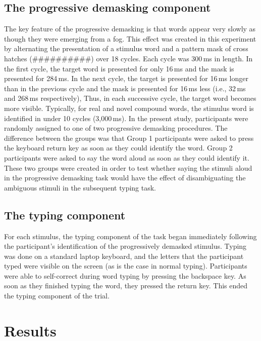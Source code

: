 \documentclass[output=paper]{langsci/langscibook}
\begin{document}
\subsection{The progressive demasking component}\label{sec:libben:2.3.1}
The key feature of the progressive demasking is that words appear very slowly as though they were emerging from a fog. This effect was created in this experiment by alternating the presentation of a stimulus word and a pattern mask of cross hatches (\#\#\#\#\#\#\#\#\#\#) over 18 cycles. Each cycle was 300\,ms in length. In the first cycle, the target word is presented for only 16\,ms and the mask is presented for 284\,ms. In the next cycle, the target is presented for 16\,ms longer than in the previous cycle and the mask is presented for 16\,ms less (i.e., 32\,ms and 268\,ms respectively), Thus, in each successive cycle, the target word becomes more visible. Typically, for real and novel compound words, the stimulus word is identified in under 10 cycles (3,000\,ms). In the present study, participants were randomly assigned to one of two progressive demasking procedures. The difference between the groups was that Group 1 participants were asked to press the keyboard return key as soon as they could identify the word. Group 2 participants were asked to say the word aloud as soon as they could identify it. These two groups were created in order to test whether saying the stimuli aloud in the progressive demasking task would have the effect of disambiguating the ambiguous stimuli in the subsequent typing task.

\subsection{The typing component}\label{sec:libben:2.3.2}
For each stimulus, the typing component of the task began immediately following the participant’s identification of the progressively demasked stimulus. Typing was done on a standard laptop keyboard, and the letters that the participant typed were visible on the screen (as is the case in normal typing). Participants were able to self-correct during word typing by pressing the backspace key. As soon as they finished typing the word, they pressed the return key. This ended the typing component of the trial.

\section{Results}\label{sec:libben:3}
\end{document}
